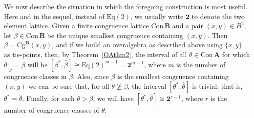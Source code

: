 \documentclass[cm,dissertation,actual,final]{uhthesis}
\theoremstyle{plain}
\theoremstyle{definition}
\theoremstyle{remark}
\numberwithin{theorem}{section}
\numberwithin{claim}{chapter}
\numberwithin{equation}{section}
\numberwithin{conjecture}{chapter}
\newcommand{\<}{\ensuremath{\langle}}
\renewcommand{\>}{\ensuremath{\rangle}}
\renewcommand{\ngeq}{\ensuremath{\ngeqslant}}
\newcommand{\Eq}{\ensuremath{\mathrm{Eq}}}
\newcommand{\Cg}{\ensuremath{\mathrm{Cg}}}
\newcommand{\Con}{\ensuremath{\mathrm{Con\,}}}
\newcommand{\0}{\ensuremath{\mathbf{0}}}
\newcommand{\1}{\ensuremath{\mathbf{1}}}
\newcommand{\2}{\ensuremath{\mathbf{2}}}
\newcommand{\3}{\ensuremath{\mathbf{3}}}
\newcommand{\4}{\ensuremath{\mathbf{4}}}
\newcommand{\5}{\ensuremath{\mathbf{5}}}
\newcommand{\bA}{\ensuremath{\mathbf{A}}}
\newcommand{\bB}{\ensuremath{\mathbf{B}}}
\newcommand{\resB}{\ensuremath{|_{_B}}}
\newcommand{\two}{\ensuremath{\mathbf{2}}}
\begin{document}
We now describe the situation in which the foregoing construction is most
useful.  Here and in the sequel, instead of $\Eq(2)$, we usually write
$\two$ to denote the two element lattice. 
Given a finite congruence lattice $\Con\bB$ and a pair $(x,y) \in B^2$,
let $\beta\in \Con\bB$ be the unique smallest congruence containing $(x,y)$.
Then $\beta = \Cg^\bB(x,y)$, and if we build an overalgebra as
described above using $\{x,y\}$ as tie-points, then, by
Theorem~\ref{OAthm2}, the interval of all
$\theta \in \Con\bA$ for which $\theta\resB = \beta$ will be 
$[\beta^*,\widehat{\beta}] \cong \Eq(2)^{m-1} = \two^{m-1}$, where $m$ is the
number of congruence classes in $\beta$.  Also, since $\beta$ is the smallest
congruence containing $(x,y)$ we can be sure that, for all $\theta \ngeq \beta$,
the interval $[\theta^*,\widehat{\theta}]$ is trivial; that is,
$\theta^*=\widehat{\theta}$. Finally, for each $\theta > \beta$, we will have 
$[\theta^*,\widehat{\theta}] \cong \two^{r-1}$, where $r$ is the number of
congruence classes of $\theta$.
\end{document}
